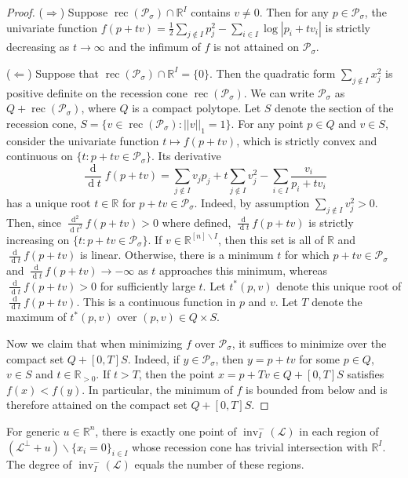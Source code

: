 \documentclass[ALCO,ThmDefs,Unicode,epreuves]{cedram}
\newcommand{\R}{\mathbb{R}}
\newcommand{\cL}{\mathcal{L}}
\newcommand{\cP}{\mathcal{P}}
\DeclareMathOperator{\inv}{inv}
\DeclareMathOperator{\dd}{d}
\DeclareMathOperator{\rec}{rec}
\begin{document}
\begin{proof}
($\Rightarrow$) Suppose $\rec(\cP_\sigma)\cap \R^I$ contains $v\neq 0$. Then for any $p\in \cP_\sigma$,
the univariate function $f(p+tv) = \frac{1}{2}\sum_{j\not\in I}p_j^2 - \sum_{i\in I}\log|p_i + t v_i|$ is strictly decreasing 
as $t\rightarrow \infty$ and the infimum of $f$ is not attained on $\cP_{\sigma}$. 

($\Leftarrow$) 
Suppose that $\rec(\cP_\sigma) \cap \R^I = \{0\}$. Then the quadratic form $\sum_{j \not\in I}x_j^2$ is 
positive definite on the recession cone $\rec(\cP_\sigma)$. 
We can write $\cP_\sigma$ as $Q + \rec(\cP_{\sigma})$, where $Q$ is a compact polytope. 
Let $S$ denote the section of the recession cone, ${S = \{v \in \rec(\cP_{\sigma}): || v||_1 =1\}.}$
For any point $p\in Q$ and $v\in S$, consider the univariate function $t\mapsto f(p+tv)$, which is strictly convex and continuous on 
$\{t : p + tv\in \cP_\sigma\}$. Its derivative 
\[
\frac{\dd}{\dd t}f(p+tv)  =  
\sum_{j \not\in I}v_jp_j  +  t\sum_{j \not\in I}v_j^2  -  \sum_{i\in I}\frac{v_i}{p_i+tv_i}
\] 
has a unique root $t\in \R$ for $p + tv\in \cP_\sigma$. 
 Indeed, by assumption $\sum_{j \not\in I}v_j^2>0$. Then, 
 since $\frac{\dd^2}{\dd t^2}f(p+tv) >0$ where defined, 
$\frac{\dd}{\dd t}f(p+tv)$ is strictly increasing on $\{t : p + tv\in \cP_\sigma\}$. 
If $v\in \R^{[n]\backslash I}$, then 
this set is all of $\R$ and $\frac{\dd}{\dd t}f(p+tv)$ is linear. Otherwise, there is a minimum 
$t$ for which $p + tv\in \cP_\sigma$ and $\frac{\dd}{\dd t}f(p+tv)\rightarrow -\infty$ as $t$
approaches this minimum, whereas $ \frac{\dd}{\dd t}f(p+tv)>0$ for sufficiently large $t$. 
Let $t^*(p,v)$ denote this unique root of $\frac{\dd}{\dd t}f(p+tv)$. This is a continuous function 
in $p$ and $v$. Let $T$ denote the maximum of $t^*(p,v)$ over $(p,v) \in Q\times S$. 

Now we claim that when minimizing $f$ over $\cP_\sigma$, it suffices to 
minimize over the compact set $Q + [0,T]S$. Indeed, if $y\in \cP_\sigma$, 
then $y = p + tv$ for some $p\in Q$, $v\in S$ and $t\in \R_{>0}$. 
If $t>T$, then the point $x = p + Tv \in Q + [0,T]S$ satisfies $f(x)< f(y)$. 
In particular, the minimum of $f$ is bounded from below and is therefore attained on the compact 
set $Q + [0,T]S$. 
\end{proof}


\begin{prop}
For generic $u\in \R^n$, there is exactly one point of $\inv_I^-(\cL)$ in each region of $(\cL^{\perp}+u)\backslash\{x_i=0\}_{i\in I}$ 
whose recession cone has trivial intersection with $\R^I$. 
The degree of $\inv_I^-(\cL)$ equals the number of these regions. 
\end{prop}
\end{document}
